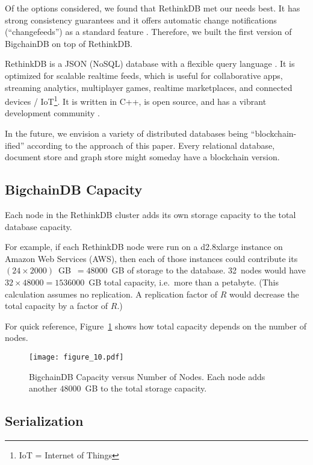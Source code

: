 Of the options considered, we found that RethinkDB met our needs best.
It has strong consistency guarantees \cite{rethinkdb_consistency} and it offers automatic change notifications (“changefeeds”) as a standard feature \cite{rethinkdb_changefeeds}.
Therefore, we built the first version of BigchainDB on top of RethinkDB.

RethinkDB is a JSON (NoSQL) database with a flexible query language \cite{rethinkdb_faq}.
It is optimized for scalable realtime feeds, which is useful for collaborative apps, streaming analytics, multiplayer games, realtime marketplaces, and connected devices / IoT\footnote{IoT = Internet of Things}.
It is written in C++, is open source, and has a vibrant development community \cite{rethinkdb_github}.

In the future, we envision a variety of distributed databases being “blockchain-ified” according to the approach of this paper.
Every relational database, document store and graph store might someday have a blockchain version.


\subsection{BigchainDB Capacity}

Each node in the RethinkDB cluster adds its own storage capacity to the total database capacity.

For example, if each RethinkDB node were run on a d2.8xlarge instance on Amazon Web Services (AWS), then each of those instances could contribute its $(24 \times 2000)$~GB~$= 48000$~GB of storage to the database. 32~nodes would have $32 \times 48000 = 1536000$~GB total capacity, i.e.~more than a petabyte. (This calculation assumes no replication. A replication factor of $R$ would decrease the total capacity by a factor of $R$.)

For quick reference, Figure~\ref{fig:bigchain_capacity_vs_nodes} shows how total capacity depends on the number of nodes. 

\begin{figure}[!ht]
  \centering
  \texttt{[image: figure\_10.pdf]}
  \caption{BigchainDB Capacity versus Number of Nodes. Each node adds another $48000$~GB to the total storage capacity.}
  \label{fig:bigchain_capacity_vs_nodes}
\end{figure}


\subsection{Serialization}

